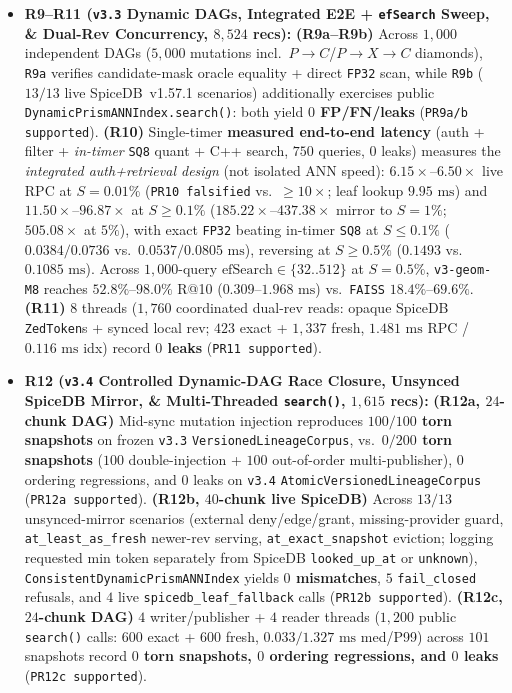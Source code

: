 \documentclass[conference]{IEEEtran}
\begin{document}
\begin{itemize}
    \item \textbf{R9--R11 (\texttt{v3.3} Dynamic DAGs, Integrated E2E + \texttt{efSearch} Sweep, \& Dual-Rev Concurrency, $8{,}524$ recs):} \textbf{(R9a--R9b)} Across $1{,}000$ independent DAGs ($5{,}000$ mutations incl.\ $P{\to}C$/$P{\to}X{\to}C$ diamonds), \texttt{R9a} verifies candidate-mask oracle equality + direct \texttt{FP32} scan, while \texttt{R9b} ($13/13$ live SpiceDB~v1.57.1 scenarios) additionally exercises public \texttt{DynamicPrismANNIndex.search()}: both yield \textbf{$0$ FP/FN/leaks} (\texttt{PR9a/b supported}). \textbf{(R10)} Single-timer \textbf{measured end-to-end latency} (auth + filter + \textit{in-timer} \texttt{SQ8} quant + C++ search, $750$ queries, $0$ leaks) measures the \textit{integrated auth+retrieval design} (not isolated ANN speed): $6.15\times$--$6.50\times$ live RPC at $S{=}0.01\%$ (\texttt{PR10 falsified} vs.\ $\ge 10\times$; leaf lookup $9.95\text{ ms}$) and $11.50\times$--$96.87\times$ at $S \ge 0.1\%$ ($185.22\times$--$437.38\times$ mirror to $S{=}1\%$; $505.08\times$ at $5\%$), with exact \texttt{FP32} beating in-timer \texttt{SQ8} at $S \le 0.1\%$ ($0.0384/0.0736$ vs.\ $0.0537/0.0805\text{ ms}$), reversing at $S \ge 0.5\%$ ($0.1493$ vs.\ $0.1085\text{ ms}$). Across $1{,}000$-query $\text{efSearch}\in\{32..512\}$ at $S{=}0.5\%$, \texttt{v3-geom-M8} reaches $52.8\%$--$98.0\%$ R@10 ($0.309$--$1.968\text{ ms}$) vs.\ \texttt{FAISS} $18.4\%$--$69.6\%$. \textbf{(R11)} $8$ threads ($1{,}760$ coordinated dual-rev reads: opaque SpiceDB \texttt{ZedToken}s + synced local rev; $423$ exact + $1{,}337$ fresh, $1.481\text{ ms}$ RPC / $0.116\text{ ms}$ idx) record \textbf{$0$ leaks} (\texttt{PR11 supported}).
    \item \textbf{R12 (\texttt{v3.4} Controlled Dynamic-DAG Race Closure, Unsynced SpiceDB Mirror, \& Multi-Threaded \texttt{search()}, $1{,}615$ recs):} \textbf{(R12a, $24$-chunk DAG)} Mid-sync mutation injection reproduces \textbf{$100/100$ torn snapshots} on frozen \texttt{v3.3} \texttt{VersionedLineageCorpus}, vs.\ \textbf{$0/200$ torn snapshots} ($100$ double-injection + $100$ out-of-order multi-publisher), $0$ ordering regressions, and $0$ leaks on \texttt{v3.4} \texttt{AtomicVersionedLineageCorpus} (\texttt{PR12a supported}). \textbf{(R12b, $40$-chunk live SpiceDB)} Across $13/13$ unsynced-mirror scenarios (external deny/edge/grant, missing-provider guard, \texttt{at\_least\_as\_fresh} newer-rev serving, \texttt{at\_exact\_snapshot} eviction; logging requested min token separately from SpiceDB \texttt{looked\_up\_at} or \texttt{unknown}), \texttt{ConsistentDynamicPrismANNIndex} yields \textbf{$0$ mismatches}, $5$ \texttt{fail\_closed} refusals, and $4$ live \texttt{spicedb\_leaf\_fallback} calls (\texttt{PR12b supported}). \textbf{(R12c, $24$-chunk DAG)} $4$ writer/publisher + $4$ reader threads ($1{,}200$ public \texttt{search()} calls: $600$ exact + $600$ fresh, $0.033/1.327\text{ ms}$ med/P99) across $101$ snapshots record \textbf{$0$ torn snapshots, $0$ ordering regressions, and $0$ leaks} (\texttt{PR12c supported}).
\end{itemize}
\end{document}
